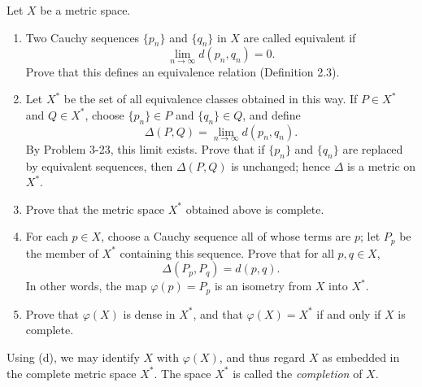 \documentclass{article}
\begin{document}
\begin{problem}[3-24]
Let $X$ be a metric space.

\begin{enumerate}
	\item[(a)] Two Cauchy sequences $\{p_n\}$ and $\{q_n\}$ in $X$ are called equivalent if
	\[
	\lim_{n\to\infty} d(p_n,q_n)=0.
	\]
	Prove that this defines an equivalence relation (Definition 2.3).

	\item[(b)] Let $X^*$ be the set of all equivalence classes obtained in this way. If $P\in X^*$ and $Q\in X^*$, choose $\{p_n\}\in P$ and $\{q_n\}\in Q$, and define
	\[
	\Delta(P,Q)=\lim_{n\to\infty} d(p_n,q_n).
	\]
	By Problem 3-23, this limit exists. Prove that if $\{p_n\}$ and $\{q_n\}$ are replaced by equivalent sequences, then $\Delta(P,Q)$ is unchanged; hence $\Delta$ is a metric on $X^*$.

	\item[(c)] Prove that the metric space $X^*$ obtained above is complete.

	\item[(d)] For each $p\in X$, choose a Cauchy sequence all of whose terms are $p$; let $P_p$ be the member of $X^*$ containing this sequence. Prove that for all $p,q\in X$,
	\[
	\Delta(P_p,P_q)=d(p,q).
	\]
	In other words, the map $\varphi(p)=P_p$ is an isometry from $X$ into $X^*$.

	\item[(e)] Prove that $\varphi(X)$ is dense in $X^*$, and that $\varphi(X)=X^*$ if and only if $X$ is complete.
	\end{enumerate}\par
	Using (d), we may identify $X$ with $\varphi(X)$, and thus regard $X$ as embedded in the complete metric space $X^*$. The space $X^*$ is called the \emph{completion} of $X$.
\end{problem}
\end{document}
